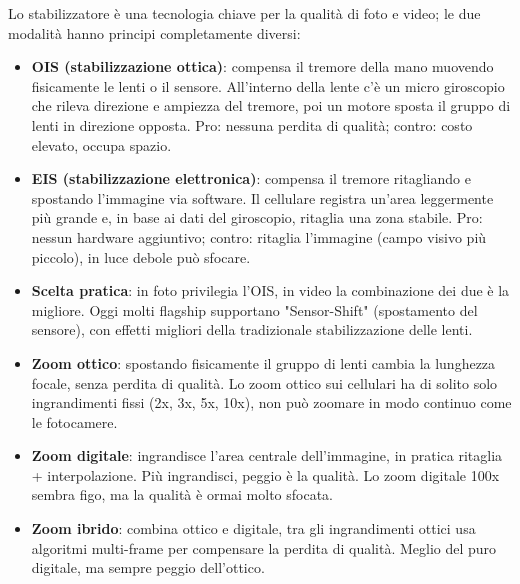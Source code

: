 
Lo stabilizzatore è una tecnologia chiave per la qualità di foto e video; le due modalità hanno principi completamente diversi:

\begin{itemize}
  \item \textbf{OIS (stabilizzazione ottica)}: compensa il tremore della mano muovendo fisicamente le lenti o il sensore. All'interno della lente c'è un micro giroscopio che rileva direzione e ampiezza del tremore, poi un motore sposta il gruppo di lenti in direzione opposta. Pro: nessuna perdita di qualità; contro: costo elevato, occupa spazio.
  \item \textbf{EIS (stabilizzazione elettronica)}: compensa il tremore ritagliando e spostando l'immagine via software. Il cellulare registra un'area leggermente più grande e, in base ai dati del giroscopio, ritaglia una zona stabile. Pro: nessun hardware aggiuntivo; contro: ritaglia l'immagine (campo visivo più piccolo), in luce debole può sfocare.
  \item \textbf{Scelta pratica}: in foto privilegia l'OIS, in video la combinazione dei due è la migliore. Oggi molti flagship supportano "Sensor-Shift" (spostamento del sensore), con effetti migliori della tradizionale stabilizzazione delle lenti.
\end{itemize}


\begin{itemize}
  \item \textbf{Zoom ottico}: spostando fisicamente il gruppo di lenti cambia la lunghezza focale, senza perdita di qualità. Lo zoom ottico sui cellulari ha di solito solo ingrandimenti fissi (2x, 3x, 5x, 10x), non può zoomare in modo continuo come le fotocamere.
  \item \textbf{Zoom digitale}: ingrandisce l'area centrale dell'immagine, in pratica ritaglia + interpolazione. Più ingrandisci, peggio è la qualità. Lo zoom digitale 100x sembra figo, ma la qualità è ormai molto sfocata.
  \item \textbf{Zoom ibrido}: combina ottico e digitale, tra gli ingrandimenti ottici usa algoritmi multi-frame per compensare la perdita di qualità. Meglio del puro digitale, ma sempre peggio dell'ottico.
\end{itemize}


